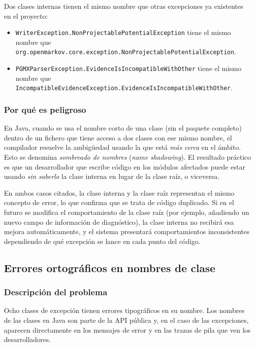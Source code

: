 \documentclass[11pt,a4paper]{article}
\newcommand{\jdot}{.\discretionary{}{}{}}
\begin{document}
Dos clases internas tienen el mismo nombre que otras excepciones ya existentes en el proyecto:

\begin{itemize}
    \item \texttt{WriterException\jdot NonProjectablePotentialException} tiene el mismo nombre que
          \texttt{org\jdot openmarkov\jdot core\jdot exception\jdot NonProjectablePotentialException}.
    \item \texttt{PGMXParserException\jdot EvidenceIsIncompatibleWithOther} tiene el mismo nombre que
          \texttt{IncompatibleEvidenceException\jdot EvidenceIsIncompatibleWithOther}.
\end{itemize}

\subsubsection{Por qué es peligroso}

En Java, cuando se usa el nombre corto de una clase (sin el paquete completo) dentro de un
fichero que tiene acceso a dos clases con ese mismo nombre, el compilador resuelve la ambigüedad
usando la que está \emph{más cerca} en el ámbito. Esto se denomina \textit{sombreado de nombres}
(\textit{name shadowing}). El resultado práctico es que un desarrollador que escribe código en
los módulos afectados puede estar usando \emph{sin saberlo} la clase interna en lugar de la clase
raíz, o viceversa.

En ambos casos citados, la clase interna y la clase raíz representan el mismo concepto de error,
lo que confirma que se trata de código duplicado. Si en el futuro se modifica el comportamiento
de la clase raíz (por ejemplo, añadiendo un nuevo campo de información de diagnóstico), la clase
interna no recibirá esa mejora automáticamente, y el sistema presentará comportamientos
inconsistentes dependiendo de qué excepción se lance en cada punto del código.

\subsection{Errores ortográficos en nombres de clase}

\subsubsection{Descripción del problema}

Ocho clases de excepción tienen errores tipográficos en su nombre. Los nombres de las clases
en Java son parte de la API pública y, en el caso de las excepciones, aparecen directamente en
los mensajes de error y en las trazas de pila que ven los desarrolladores.
\end{document}
